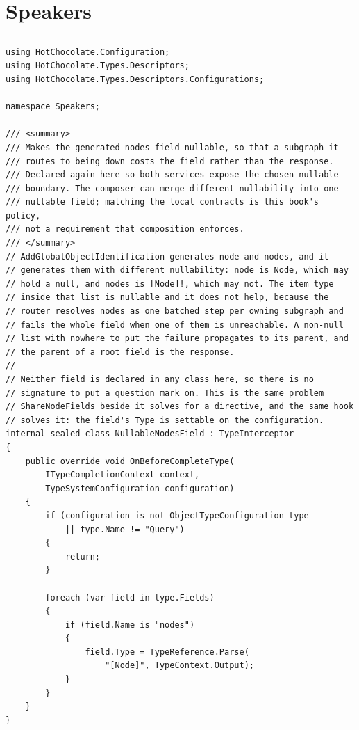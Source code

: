 \section{Speakers}

\subsection*{}
\begin{verbatim}
using HotChocolate.Configuration;
using HotChocolate.Types.Descriptors;
using HotChocolate.Types.Descriptors.Configurations;

namespace Speakers;

/// <summary>
/// Makes the generated nodes field nullable, so that a subgraph it
/// routes to being down costs the field rather than the response.
/// Declared again here so both services expose the chosen nullable
/// boundary. The composer can merge different nullability into one
/// nullable field; matching the local contracts is this book's policy,
/// not a requirement that composition enforces.
/// </summary>
// AddGlobalObjectIdentification generates node and nodes, and it
// generates them with different nullability: node is Node, which may
// hold a null, and nodes is [Node]!, which may not. The item type
// inside that list is nullable and it does not help, because the
// router resolves nodes as one batched step per owning subgraph and
// fails the whole field when one of them is unreachable. A non-null
// list with nowhere to put the failure propagates to its parent, and
// the parent of a root field is the response.
//
// Neither field is declared in any class here, so there is no
// signature to put a question mark on. This is the same problem
// ShareNodeFields beside it solves for a directive, and the same hook
// solves it: the field's Type is settable on the configuration.
internal sealed class NullableNodesField : TypeInterceptor
{
    public override void OnBeforeCompleteType(
        ITypeCompletionContext context,
        TypeSystemConfiguration configuration)
    {
        if (configuration is not ObjectTypeConfiguration type
            || type.Name != "Query")
        {
            return;
        }

        foreach (var field in type.Fields)
        {
            if (field.Name is "nodes")
            {
                field.Type = TypeReference.Parse(
                    "[Node]", TypeContext.Output);
            }
        }
    }
}
\end{verbatim}

